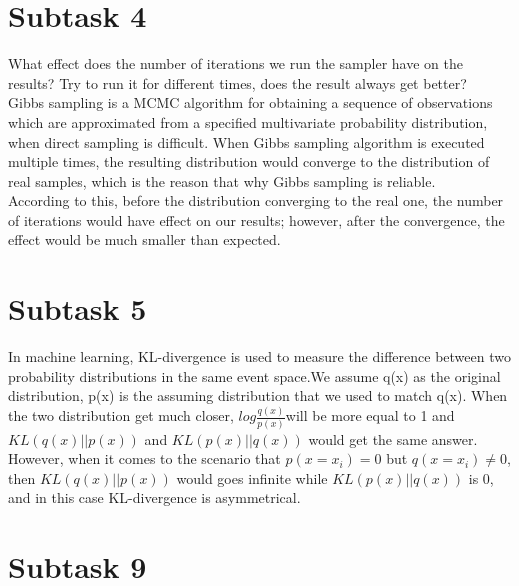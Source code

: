 \documentclass[12pt]{article}
\begin{document}
\section{Subtask 4}
What effect does the number of iterations we run the sampler have on the results? Try to run it for different times, does the result always get better?\\

Gibbs sampling is a MCMC algorithm for obtaining a sequence of observations which are approximated from a specified multivariate probability distribution, when direct sampling is difficult. When Gibbs sampling algorithm is executed multiple times, the resulting distribution would converge to the distribution of real samples, which is the reason that why Gibbs sampling is reliable.\\
According to this, before the distribution converging to the real one, the number of iterations would have effect on our results; however, after the convergence, the effect would be much smaller than expected.

\section{Subtask 5}
In machine learning, KL-divergence is used to measure the difference between two probability distributions in the same event space.We assume q(x) as the original distribution, p(x) is the assuming distribution that we used to match q(x).  When the two distribution get much closer, $log{\frac{q(x)}{p(x)}}$will be more equal to 1 and $KL(q(x)||p(x))$
and $KL(p(x)||q(x))$ would get the same answer. However, when it comes to the scenario that $p(x=x_i)=0$ but $q(x=x_i)\neq0$, then $KL(q(x)||p(x))$ would goes infinite while $KL(p(x)||q(x))$ is 0, and in this case KL-divergence is asymmetrical.

\section{Subtask 9}
\end{document}
